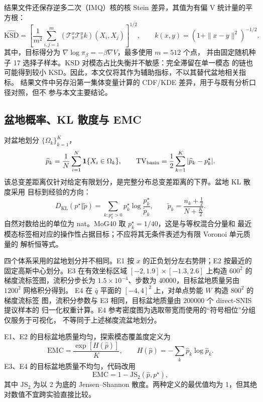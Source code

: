 \documentclass[11pt,a4paper]{article}
\begin{document}
结果文件还保存逆多二次（IMQ）核的核 Stein 差异，其值为有偏 V 统计量的平方根：
\begin{equation}
 \widehat{\mathrm{KSD}}
 =\left[
 \frac1{m^2}\sum_{i,j=1}^{m}
 (\mathcal T_\pi^x\mathcal T_\pi^y k)(X_i,X_j)
 \right]^{1/2},
 \qquad
 k(x,y)=(1+\|x-y\|^2)^{-1/2}.
\end{equation}
其中，目标得分为 $\nabla\log\pi_\beta=-\beta\nabla V$，最多使用 $m=512$ 个点，
并由固定随机种子 17 选择子样本。KSD 对模态占比失衡并不敏感：完全滞留在单一模态
的链也可能得到较小 KSD。因此，本文仅将其作为辅助指标，不以其替代盆地相关指标。
结果文件中另存沿第一集体变量计算的 CDF/KDE 差异，用于与既有分析口径对照，但不
参与本文主要结论。

\subsection{盆地概率、KL 散度与 EMC}

对盆地划分 $\{\Omega_k\}_{k=1}^{K}$，
\begin{equation}
 \widehat p_k=\frac1N\sum_{i=1}^{N}\mathbf 1\{X_i\in\Omega_k\},
 \qquad
 \mathrm{TV}_{\rm basin}
 =\frac12\sum_{k=1}^{K}|\widehat p_k-p_k^\star|.
\end{equation}
该总变差距离仅针对给定有限划分，是完整分布总变差距离的下界。盆地 KL 散度采用
目标到经验的方向：
\begin{equation}
 D_{\mathrm{KL}}(p^\star\Vert\widetilde p)
 =\sum_{k:p_k^\star>0}
 p_k^\star\log\frac{p_k^\star}{\widetilde p_k},
 \qquad
 \widetilde p_k=\frac{n_k+\tfrac12}{N+\tfrac K2}.
\end{equation}
自然对数给出的单位为 nat。MoG40 取 $p_k^\star=1/40$，这是与等权混合分量和
最近模态标签相对应的操作性占据目标；不应将其无条件表述为有限 Voronoi 单元质量的
解析恒等式。

四个体系采用的盆地划分并不相同。E1 按 $x$ 的正负划分左右势阱；E2 按最近的
固定高斯中心划分。E3 在有效坐标区域
$[-2,1.9]\times[-1.3,2.6]$ 上构造 $600^2$ 的梯度流标签图，流积分步长为
$1.5\times10^{-4}$、步数为 $40000$，目标盆地质量另由 $1200^2$ 网格积分得到。
E4 在 $\bar q$ 平面的 $[-4,4]^2$ 上，对单点势能 $W$ 构造 $800^2$ 的梯度流标签
图，流积分参数与 E3 相同，目标盆地质量由 $200000$ 个 direct-SNIS 提议样本的
归一化权重计算。E4 参考密度图为选取带宽而使用的“符号相位”分组仅服务于可视化，
不等同于上述梯度流盆地划分。

E1、E2 的目标盆地质量均匀，探索模态覆盖度定义为
\begin{equation}
 \mathrm{EMC}=\frac{\exp[H(\widehat p)]}{K},
 \qquad
 H(\widehat p)=-\sum_k\widehat p_k\log\widehat p_k.
\end{equation}
E3、E4 的目标盆地质量不均匀，代码改用
\begin{equation}
 \mathrm{EMC}=1-\mathrm{JS}_2(\widehat p,p^\star),
\end{equation}
其中 $\mathrm{JS}_2$ 为以 2 为底的 Jensen--Shannon 散度。两种定义的最优值均为
1，但其绝对数值不宜跨实验直接比较。
\end{document}
